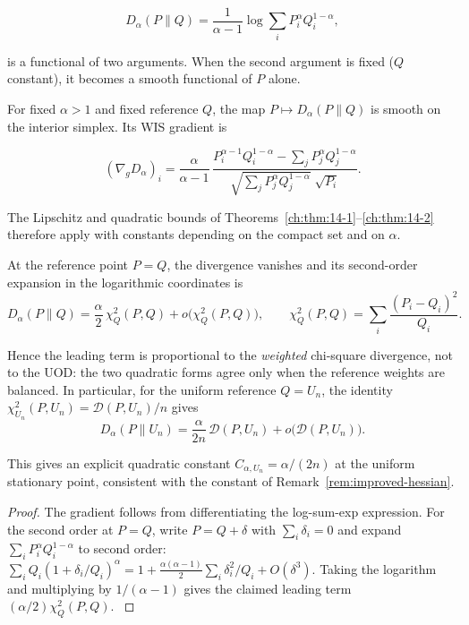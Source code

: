 \[
D_\alpha(P\|Q)
=
\frac{1}{\alpha-1}
\log
\sum_i
P_i^\alpha Q_i^{1-\alpha},
\]

is a functional of two arguments.  When the second argument is fixed
(\(Q\) constant), it becomes a smooth functional of \(P\) alone.

\begin{theorem}
\label{ch:thm:renyi-div}
For fixed \(\alpha>1\) and fixed reference \(Q\), the map
\(P\mapsto D_\alpha(P\|Q)\) is smooth on the interior simplex.  Its WIS
gradient is

\[
(\nabla_g D_\alpha)_i
=
\frac{\alpha}{\alpha-1}
\,
\frac{
P_i^{\alpha-1}Q_i^{1-\alpha}
-
\sum_j P_j^\alpha Q_j^{1-\alpha}
}{
\sqrt{\sum_j P_j^\alpha Q_j^{1-\alpha}}\;\sqrt{P_i}
}.
\]

The Lipschitz and quadratic bounds of
Theorems~\ref{ch:thm:14-1}--\ref{ch:thm:14-2} therefore apply with
constants depending on the compact set and on \(\alpha\).

At the reference point \(P=Q\), the divergence vanishes and its
second-order expansion in the logarithmic coordinates is
\[
D_\alpha(P\|Q)
=
\frac{\alpha}{2}\,\chi^2_Q(P,Q)
+
o\bigl(\chi^2_Q(P,Q)\bigr),
\qquad
\chi^2_Q(P,Q)=\sum_i \frac{(P_i-Q_i)^2}{Q_i}.
\]

Hence the leading term is proportional to the \emph{weighted}
chi-square divergence, not to the UOD: the two quadratic forms agree
only when the reference weights are balanced.  In particular, for the
uniform reference \(Q=U_n\), the identity
\(\chi^2_{U_n}(P,U_n)=\mathcal D(P,U_n)/n\) gives
\[
D_\alpha(P\|U_n)
=
\frac{\alpha}{2n}\,\mathcal D(P,U_n)
+
o\bigl(\mathcal D(P,U_n)\bigr).
\]

This gives an explicit quadratic constant
\(C_{\alpha,U_n}=\alpha/(2n)\) at the uniform stationary point,
consistent with the constant of
Remark~\ref{rem:improved-hessian}.
\end{theorem}

\begin{proof}
The gradient follows from differentiating the log-sum-exp expression.
For the second order at \(P=Q\), write \(P=Q+\delta\) with
\(\sum_i\delta_i=0\) and expand
\(\sum_i P_i^\alpha Q_i^{1-\alpha}\) to second order:
\(\sum_i Q_i(1+\delta_i/Q_i)^\alpha = 1 + \frac{\alpha(\alpha-1)}{2}\sum_i \delta_i^2/Q_i + O(\delta^3)\).
Taking the logarithm and multiplying by \(1/(\alpha-1)\) gives the
claimed leading term \((\alpha/2)\chi^2_Q(P,Q)\). \(\)
\end{proof}

